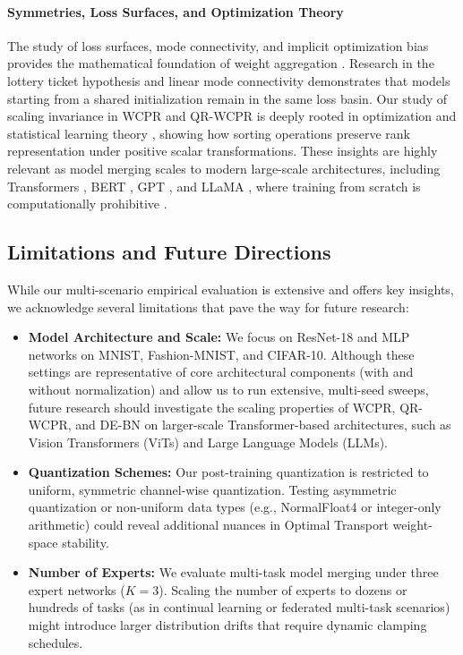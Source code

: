 \documentclass{article}
\theoremstyle{plain}
\theoremstyle{definition}
\theoremstyle{remark}
\begin{document}
\paragraph{Symmetries, Loss Surfaces, and Optimization Theory}
The study of loss surfaces, mode connectivity, and implicit optimization bias provides the mathematical foundation of weight aggregation \cite{choromanska2015loss, keskar2016on, hochreiter1997flat}. Research in the lottery ticket hypothesis and linear mode connectivity \cite{frankle2019lottery, frankle2020linear, neyshabur2020what} demonstrates that models starting from a shared initialization remain in the same loss basin. Our study of scaling invariance in WCPR and QR-WCPR is deeply rooted in optimization and statistical learning theory \cite{vapnik1998statistical, bartlett2002rademacher, shalev2014understanding, soudry2018implicit, gunasekar2018characterizing, neyshabur2015search, jacot2018neural, arora2019fine}, showing how sorting operations preserve rank representation under positive scalar transformations. These insights are highly relevant as model merging scales to modern large-scale architectures, including Transformers \cite{vaswani2017attention}, BERT \cite{devlin2018bert}, GPT \cite{radford2019language, brown2020language, achiam2023gpt}, and LLaMA \cite{touvron2023llama}, where training from scratch is computationally prohibitive \cite{zhao2023survey}.

\subsection{Limitations and Future Directions}
While our multi-scenario empirical evaluation is extensive and offers key insights, we acknowledge several limitations that pave the way for future research:
\begin{itemize}
    \item \textbf{Model Architecture and Scale:} We focus on ResNet-18 and MLP networks on MNIST, Fashion-MNIST, and CIFAR-10. Although these settings are representative of core architectural components (with and without normalization) and allow us to run extensive, multi-seed sweeps, future research should investigate the scaling properties of WCPR, QR-WCPR, and DE-BN on larger-scale Transformer-based architectures, such as Vision Transformers (ViTs) and Large Language Models (LLMs).
    \item \textbf{Quantization Schemes:} Our post-training quantization is restricted to uniform, symmetric channel-wise quantization. Testing asymmetric quantization or non-uniform data types (e.g., NormalFloat4 or integer-only arithmetic) could reveal additional nuances in Optimal Transport weight-space stability.
    \item \textbf{Number of Experts:} We evaluate multi-task model merging under three expert networks ($K=3$). Scaling the number of experts to dozens or hundreds of tasks (as in continual learning or federated multi-task scenarios) might introduce larger distribution drifts that require dynamic clamping schedules.
\end{itemize}
\end{document}
